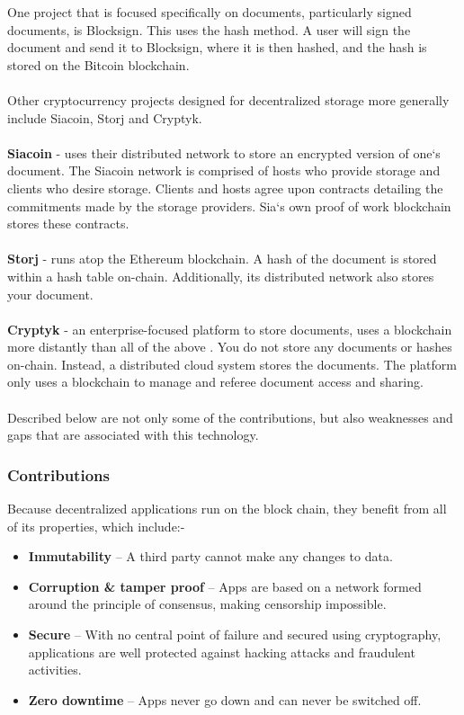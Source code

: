 One project that is focused specifically on documents, particularly signed documents, is Blocksign\cite{art14}. This uses the hash method. A user will sign the document and send it to Blocksign, where it is then hashed, and the hash is stored on the Bitcoin blockchain.\\\\
Other cryptocurrency projects designed for decentralized storage more generally include Siacoin, Storj and Cryptyk.\\\\
\textbf{Siacoin}\cite{art15} - uses their distributed network to store an encrypted version of one`s document. The Siacoin network is comprised of hosts who provide storage and clients who desire storage. Clients and hosts agree upon contracts detailing the commitments made by the storage providers. Sia`s own proof of work blockchain stores these contracts.\\\\
\textbf{Storj}\cite{16} - runs atop the Ethereum blockchain. A hash of the document is stored within a hash table on-chain. Additionally, its distributed network also stores your document.\\\\
\textbf{Cryptyk}\cite{art17} - an enterprise-focused platform to store documents, uses a blockchain more distantly than all of the above	. You do not store any documents or hashes on-chain. Instead, a distributed cloud system stores the documents. The platform only uses a blockchain to manage and referee document access and sharing.\\\\
Described below are not only some of the contributions, but also weaknesses and gaps that are associated with this technology.
\subsubsection{Contributions}

Because decentralized applications run on the block chain, they benefit from all of its properties, which include:-\\
\begin{itemize}
\item \textbf{Immutability} – A third party cannot make any changes to data.
\item \textbf{Corruption \& tamper proof} – Apps are based on a network formed around the principle of consensus, making censorship impossible.
\item \textbf{Secure} – With no central point of failure and secured using cryptography, applications are well protected against hacking attacks and fraudulent activities.
\item \textbf{Zero downtime} – Apps never go down and can never be switched off.

\end{itemize}

